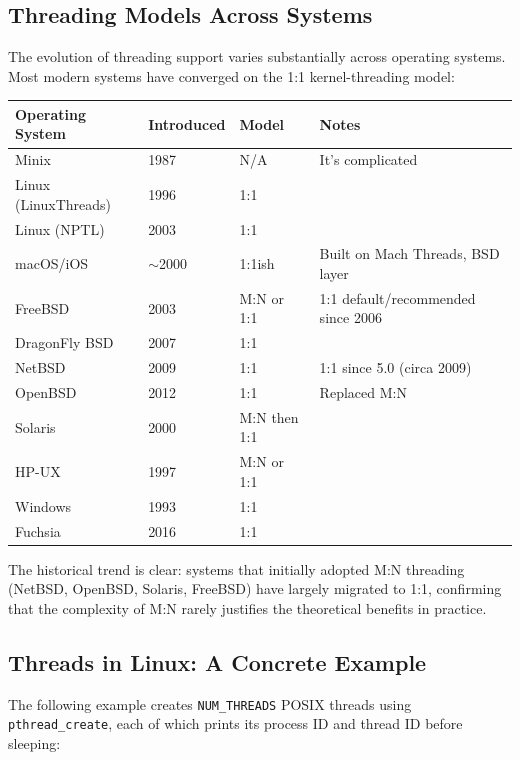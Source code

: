 \documentclass[11pt]{article}
\begin{document}
\subsection{Threading Models Across Systems}

The evolution of threading support varies substantially across operating systems. Most modern systems have converged on the 1:1 kernel-threading model:

\begin{center}
\begin{tabular}{llll}
\toprule
\textbf{Operating System} & \textbf{Introduced} & \textbf{Model} & \textbf{Notes} \\
\midrule
Minix          & 1987  & N/A           & It's complicated \\
Linux (LinuxThreads) & 1996 & 1:1      & \\
Linux (NPTL)   & 2003  & 1:1           & \\
macOS/iOS      & $\sim$2000 & 1:1ish   & Built on Mach Threads, BSD layer \\
FreeBSD        & 2003  & M:N or 1:1    & 1:1 default/recommended since 2006 \\
DragonFly BSD  & 2007  & 1:1           & \\
NetBSD         & 2009  & 1:1           & 1:1 since 5.0 (circa 2009) \\
OpenBSD        & 2012  & 1:1           & Replaced M:N \\
Solaris        & 2000  & M:N then 1:1  & \\
HP-UX          & 1997  & M:N or 1:1    & \\
Windows        & 1993  & 1:1           & \\
Fuchsia        & 2016  & 1:1           & \\
\bottomrule
\end{tabular}
\end{center}

The historical trend is clear: systems that initially adopted M:N threading (NetBSD, OpenBSD, Solaris, FreeBSD) have largely migrated to 1:1, confirming that the complexity of M:N rarely justifies the theoretical benefits in practice.

\subsection{Threads in Linux: A Concrete Example}

The following example creates \texttt{NUM\_THREADS} POSIX threads using \texttt{pthread\_create}, each of which prints its process ID and thread ID before sleeping:
\end{document}

